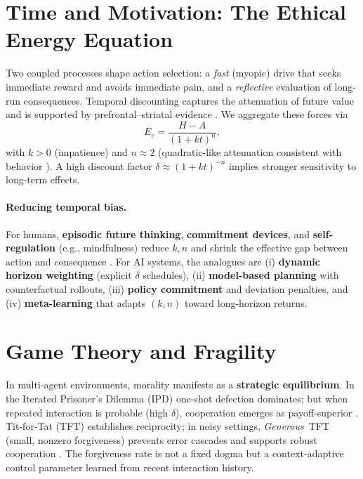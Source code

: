 \documentclass[11pt,a4paper]{article}
\begin{document}
\section{Time and Motivation: The Ethical Energy Equation}
Two coupled processes shape action selection: a \emph{fast} (myopic) drive that seeks immediate reward and avoids immediate pain, and a \emph{reflective} evaluation of long-run consequences. Temporal discounting captures the attenuation of future value \cite{Ainslie1975,Frederick2002} and is supported by prefrontal--striatal evidence \cite{KableGlimcher2007}. We aggregate these forces via
\begin{equation}
E_c=\frac{H-A}{(1+k t)^n},
\label{eq:Ec}
\end{equation}
with $k>0$ (impatience) and $n\approx 2$ (quadratic-like attenuation consistent with behavior \cite{Ainslie1975,Frederick2002}). A high discount factor $\delta\approx(1+kt)^{-n}$ implies stronger sensitivity to long-term effects.

\paragraph{Reducing temporal bias.}
For humans, \textbf{episodic future thinking}, \textbf{commitment devices}, and \textbf{self-regulation} (e.g., mindfulness) reduce $k,n$ and shrink the effective gap between action and consequence \cite{Mischel1989,Frederick2002}. For AI systems, the analogues are (i) \textbf{dynamic horizon weighting} (explicit $\delta$ schedules), (ii) \textbf{model-based planning} with counterfactual rollouts, (iii) \textbf{policy commitment} and deviation penalties, and (iv) \textbf{meta-learning} that adapts $(k,n)$ toward long-horizon returns.

\section{Game Theory and Fragility}
In multi-agent environments, morality manifests as a \textbf{strategic equilibrium}. In the Iterated Prisoner's Dilemma (IPD) one-shot defection dominates; but when repeated interaction is probable (high $\delta$), cooperation emerges as payoff-superior \cite{Axelrod1984,MaynardSmith1982}. Tit-for-Tat (TFT) establishes reciprocity; in noisy settings, \emph{Generous}~TFT (small, nonzero forgiveness) prevents error cascades and supports robust cooperation \cite{Nowak2006}. The forgiveness rate is not a fixed dogma but a context-adaptive control parameter learned from recent interaction history.
\end{document}
